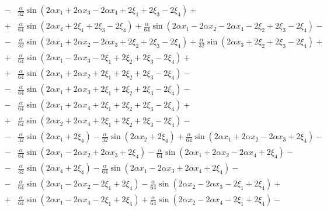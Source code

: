 \documentclass[11pt]{jfm}
\numberwithin{equation}{section}
\begin{document}
\begin{eqnarray}
&\!-\!& \frac{\alpha}{32} \sin(2\alpha x_1 \!+\! 2\alpha x_3 \!-\! 2\alpha x_4 \!+\! 2\xi_1 \!+\! 2\xi_3 \!-\! 2\xi_4)\!+\!\nonumber\\
&\!+\!& \frac{\alpha}{64} \sin(2\alpha x_4 \!+\! 2\xi_1 \!+\! 2\xi_3 \!-\! 2\xi_4)\!+\! \frac{\alpha}{64} \sin(2\alpha x_1 \!-\! 2\alpha x_2 \!-\! 2\alpha x_4 \!-\! 2\xi_2 \!+\! 2\xi_3 \!-\! 2\xi_4)\!-\!\nonumber\\
&\!-\!& \frac{\alpha}{32} \sin(2\alpha x_1 \!+\! 2\alpha x_2 \!-\! 2\alpha x_3 \!+\! 2\xi_2 \!+\! 2\xi_3 \!-\! 2\xi_4)\!+\! \frac{\alpha}{32} \sin(2\alpha x_3 \!+\! 2\xi_2 \!+\! 2\xi_3 \!-\! 2\xi_4)\!+\! \nonumber\\
&\!+\!& \frac{\alpha}{64} \sin(2\alpha x_1 \!-\! 2\alpha x_3 \!-\! 2\xi_1 \!+\! 2\xi_2 \!+\! 2\xi_3 \!-\! 2\xi_4)\!+\! \nonumber\\
&\!+\!& \frac{\alpha}{64} \sin(2\alpha x_1 \!+\! 2\alpha x_2 \!+\! 2\xi_1 \!+\! 2\xi_2 \!+\! 2\xi_3 \!-\! 2\xi_4)\!-\!\nonumber\\
&\!-\!& \frac{\alpha}{64} \sin(2\alpha x_1 \!+\! 2\alpha x_3 \!+\! 2\xi_1 \!+\! 2\xi_2 \!+\! 2\xi_3 \!-\! 2\xi_4)\!-\! \nonumber\\
&\!-\!& \frac{\alpha}{64} \sin(2\alpha x_1 \!+\! 2\alpha x_4 \!+\! 2\xi_1 \!+\! 2\xi_2 \!+\! 2\xi_3 \!-\! 2\xi_4)\!+\!\nonumber\\
&\!+\!&\frac{\alpha}{64} \sin(2\alpha x_2 \!+\! 2\alpha x_4 \!+\! 2\xi_1 \!+\! 2\xi_2 \!+\! 2\xi_3 \!-\! 2\xi_4)\!-\! \nonumber\\
&\!-\!& \frac{\alpha}{32} \sin(2\alpha x_1 \!+\! 2\xi_4)\!-\! \frac{\alpha}{32} \sin(2\alpha x_2 \!+\! 2\xi_4)
\!+\! \frac{\alpha}{64} \sin(2\alpha x_1 \!+\! 2\alpha x_2 \!-\! 2\alpha x_3 \!+\! 2\xi_4)\!-\!\nonumber\\
&\!-\!& \frac{\alpha}{64} \sin(2\alpha x_1 \!-\! 2\alpha x_2 \!+\! 2\alpha x_3 \!+\! 2\xi_4)\!-\! \frac{\alpha}{64} \sin(2\alpha x_1 \!+\! 2\alpha x_2 \!-\! 2\alpha x_4 \!+\! 2\xi_4)\!-\!\nonumber\\
&\!-\!& \frac{\alpha}{32} \sin(2\alpha x_4 \!+\! 2\xi_4)\!-\! \frac{\alpha}{64} \sin(2\alpha x_1 \!-\! 2\alpha x_3 \!+\! 2\alpha x_4 \!+\! 2\xi_4)\!-\!\nonumber\\
&\!-\!&\frac{\alpha}{64} \sin(2\alpha x_1 \!-\! 2\alpha x_2 \!-\! 2\xi_1 \!+\! 2\xi_4)\!-\! \frac{\alpha}{64} \sin(2\alpha x_2 \!-\! 2\alpha x_3 \!-\! 2\xi_1 \!+\! 2\xi_4)\!+\!\nonumber\\
&\!+\! &\frac{\alpha}{64} \sin(2\alpha x_1 \!-\! 2\alpha x_4 \!-\! 2\xi_1 \!+\! 2\xi_4) \!+\! \frac{\alpha}{64} \sin(2\alpha x_2 \!-\! 2\alpha x_4 \!-\! 2\xi_1 \!+\! 2\xi_4)\!-\!\nonumber\\

\end{eqnarray}
\end{document}
